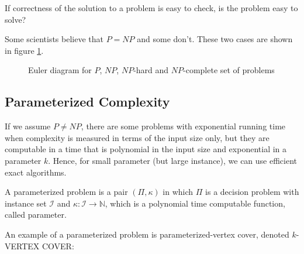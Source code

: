 \documentclass{beamer}
\begin{document}
{\begin{defi}
If correctness of the solution to a problem is easy to check, is the problem easy to solve? 

Some scientists believe that $P = NP$ and some don't. These two cases are shown in figure \ref{fig}.

\newcommand{\boundellipse}[3]%
{(#1) ellipse (#2 and #3)
}

\begin{figure}[!ht]
\centering


\caption{\tiny Euler diagram for $P$, $NP$, $NP$-hard and $NP$-complete set of problems}\label{fig}
\end{figure}

\newpage
\subsection{Parameterized Complexity}

If we assume $P \not = NP$, there are some problems with exponential running time when complexity is measured in terms of the input size only, but they are computable in a time that is polynomial in the input size and exponential in a parameter $k$. Hence, for small parameter (but large instance), we can use efficient exact algorithms. 

\begin{defi}
A parameterized problem is a pair $(\Pi, \kappa)$ in which $\Pi$ is a
decision problem with instance set $\mathcal{I}$ and $\kappa : \mathcal{I} \to \mathbb{N}$, which is a polynomial
time computable function, called parameter.
\end{defi}

\begin{exam}
An example of a parameterized problem is parameterized-vertex cover, denoted $k$-VERTEX COVER:


\end{exam}
\end{defi}}
\end{document}
